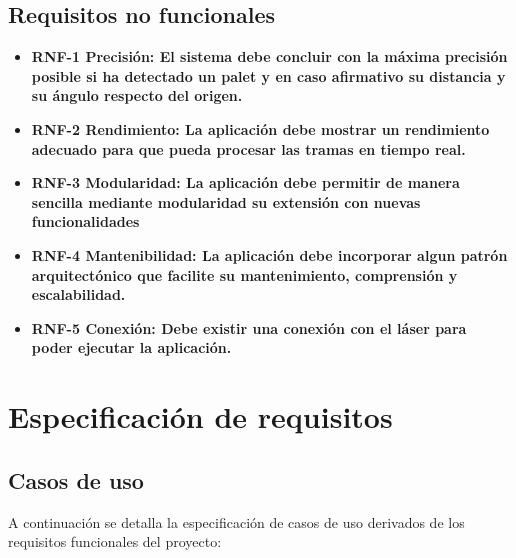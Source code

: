 \subsection{Requisitos no funcionales}
\begin{itemize}
	\item \textbf{RNF-1 Precisión: El sistema debe concluir con la máxima precisión posible si ha detectado un palet y en caso afirmativo su distancia y su ángulo respecto del origen.}
	\item \textbf{RNF-2 Rendimiento: La aplicación debe mostrar un rendimiento adecuado para que pueda procesar las tramas en tiempo real.}
	\item \textbf{RNF-3 Modularidad: La aplicación debe permitir de manera sencilla mediante modularidad su extensión con nuevas funcionalidades}
	\item \textbf{RNF-4 Mantenibilidad: La aplicación debe incorporar algun patrón arquitectónico que facilite su mantenimiento, comprensión y escalabilidad.}
	\item \textbf{RNF-5 Conexión: Debe existir una conexión con el láser para poder ejecutar la aplicación.}
\end{itemize}

\section{Especificación de requisitos}
\subsection{Casos de uso}
A continuación se detalla la especificación de casos de uso derivados de los requisitos funcionales del proyecto:\\

